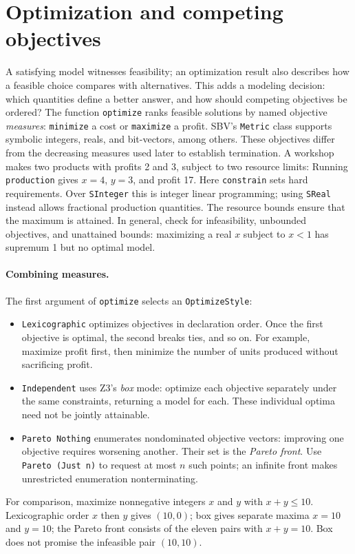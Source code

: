 \documentclass[review]{jfp-epi}
\newcommand{\code}[1]{\texttt{#1}}
\begin{document}


\section{Optimization and competing objectives}
\label{sec:optimization}

A satisfying model witnesses feasibility; an optimization result also describes
how a feasible choice compares with alternatives. This adds a modeling decision:
which quantities define a better answer, and how should competing objectives be
ordered? The function \code{optimize} ranks feasible solutions by named objective
\emph{measures}: \code{minimize} a cost or \code{maximize} a profit.
SBV's \code{Metric} class supports symbolic integers, reals, and bit-vectors,
among others. These objectives differ from the decreasing measures used later
to establish termination.
A workshop makes two products with profits 2 and 3, subject to two resource
limits:
Running \code{production} gives $x=4$, $y=3$, and profit 17.
Here \code{constrain} sets hard requirements. Over \code{SInteger} this is integer linear programming;
using \code{SReal} instead allows fractional production quantities. The resource
bounds ensure that the maximum is attained. In general, check for infeasibility,
unbounded objectives, and unattained bounds: maximizing a real $x$ subject to
$x<1$ has supremum 1 but no optimal model.

\paragraph{Combining measures.}
The first argument of \code{optimize} selects an \code{OptimizeStyle}:
\begin{itemize}
\item \code{Lexicographic} optimizes objectives in declaration order. Once the
  first objective is optimal, the second breaks ties, and so on. For example,
  maximize profit first, then minimize the number of units produced without
  sacrificing profit.
\item \code{Independent} uses Z3's \emph{box} mode: optimize each objective
  separately under the same constraints, returning a model for each. These
  individual optima need not be jointly attainable.
\item \code{Pareto Nothing} enumerates nondominated objective vectors: improving
  one objective requires worsening another. Their set is the \emph{Pareto front}.
  Use \code{Pareto (Just n)} to request at most $n$ such points; an infinite
  front makes unrestricted enumeration nonterminating.
\end{itemize}
For comparison, maximize nonnegative integers $x$ and $y$ with
$x+y\leq 10$. Lexicographic order $x$ then $y$ gives $(10,0)$; box gives separate
maxima $x=10$ and $y=10$; the Pareto front consists of the eleven pairs with
$x+y=10$. Box does not promise the infeasible pair $(10,10)$.
\end{document}
